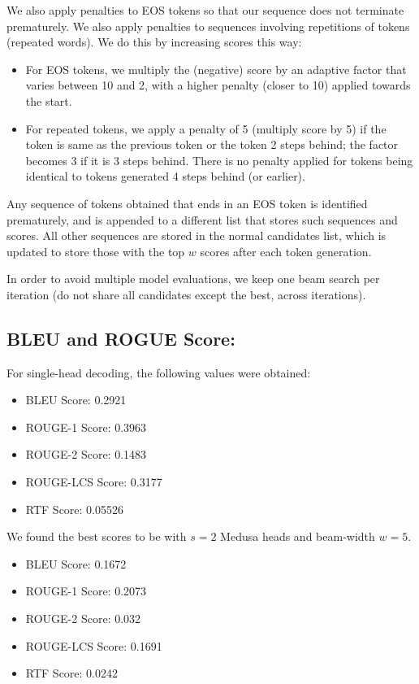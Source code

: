 \documentclass{article}
\begin{document}
We also apply penalties to EOS tokens so that our sequence does not terminate prematurely. We also apply penalties to sequences involving repetitions of tokens (repeated words). We do this by increasing scores this way:
\begin{itemize}
    \item For EOS tokens, we multiply the (negative) score by an adaptive factor that varies between 10 and 2, with a higher penalty (closer to 10) applied towards the start.
    \item For repeated tokens, we apply a penalty of 5 (multiply score by 5) if the token is same as the previous token or the token 2 steps behind; the factor becomes 3 if it is 3 steps behind. There is no penalty applied for tokens being identical to tokens generated 4 steps behind (or earlier).
\end{itemize}
Any sequence of tokens obtained that ends in an EOS token is identified prematurely, and is appended to a different list that stores such sequences and scores. All other sequences are stored in the normal candidates list, which is updated to store those with the top $w$ scores after each token generation.

In order to avoid multiple model evaluations, we keep one beam search per iteration (do not share all candidates except the best, across iterations).

\subsection{BLEU and ROGUE Score:}
For single-head decoding, the following values were obtained:
\begin{itemize}
    \item BLEU Score: 0.2921
    \item ROUGE-1 Score: 0.3963
    \item ROUGE-2 Score: 0.1483
    \item ROUGE-LCS Score: 0.3177
    \item RTF Score: 0.05526
\end{itemize}

We found the best scores to be with $s = 2$ Medusa heads and beam-width $w = 5$.
\begin{itemize}
    \item BLEU Score: 0.1672
    \item ROUGE-1 Score: 0.2073
    \item ROUGE-2 Score: 0.032
    \item ROUGE-LCS Score: 0.1691
    \item RTF Score: 0.0242
\end{itemize}
\end{document}
